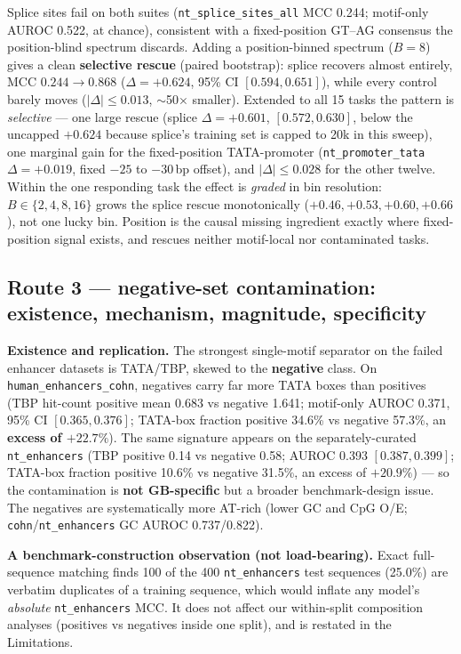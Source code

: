 \documentclass{ws-procs11x85}
\begin{document}
Splice sites fail on both suites (\texttt{nt\_splice\_sites\_all} MCC 0.244; motif-only AUROC 0.522, at
chance), consistent with a fixed-position GT--AG consensus the position-blind spectrum discards. Adding a
position-binned spectrum ($B{=}8$) gives a clean \textbf{selective rescue} (paired bootstrap): splice
recovers almost entirely, MCC $0.244\to0.868$ ($\Delta{=}+0.624$, 95\% CI $[0.594, 0.651]$), while every
control barely moves ($|\Delta|\le0.013$, $\sim$50$\times$ smaller). Extended to all 15 tasks the pattern
is \emph{selective} --- one large rescue (splice $\Delta{=}+0.601$, $[0.572, 0.630]$, below the uncapped
$+0.624$ because splice's training set is capped to 20k in this sweep), one marginal gain for the
fixed-position TATA-promoter (\texttt{nt\_promoter\_tata} $\Delta{=}+0.019$, fixed $-25$ to $-30$\,bp
offset), and $|\Delta|\le0.028$ for the other twelve. Within the one responding task the effect is
\emph{graded} in bin resolution: $B\in\{2,4,8,16\}$ grows the splice rescue monotonically
($+0.46, +0.53, +0.60, +0.66$), not one lucky bin. Position is the causal missing ingredient exactly where
fixed-position signal exists, and rescues neither motif-local nor contaminated tasks.

\subsection{Route 3 --- negative-set contamination: existence, mechanism, magnitude,
specificity}\label{route-3}

\textbf{Existence and replication.} The strongest single-motif separator on the failed enhancer datasets
is TATA/TBP, skewed to the \textbf{negative} class. On \texttt{human\_enhancers\_cohn}, negatives carry
far more TATA boxes than positives (TBP hit-count positive mean 0.683 vs negative 1.641; motif-only AUROC
0.371, 95\% CI $[0.365, 0.376]$; TATA-box fraction positive 34.6\% vs negative 57.3\%, an \textbf{excess
of $+22.7\%$}). The same signature appears on the separately-curated \texttt{nt\_enhancers} (TBP positive
0.14 vs negative 0.58; AUROC 0.393 $[0.387, 0.399]$; TATA-box fraction positive 10.6\% vs negative
31.5\%, an excess of $+20.9\%$) --- so the contamination is \textbf{not GB-specific} but a broader
benchmark-design issue. The negatives are systematically more AT-rich (lower GC and CpG O/E;
\texttt{cohn}/\texttt{nt\_enhancers} GC AUROC 0.737/0.822).

\textbf{A benchmark-construction observation (not load-bearing).} Exact full-sequence matching finds 100
of the 400 \texttt{nt\_enhancers} test sequences (25.0\%) are verbatim duplicates of a training sequence,
which would inflate any model's \emph{absolute} \texttt{nt\_enhancers} MCC. It does not affect our
within-split composition analyses (positives vs negatives inside one split), and is restated in the
Limitations.
\end{document}
